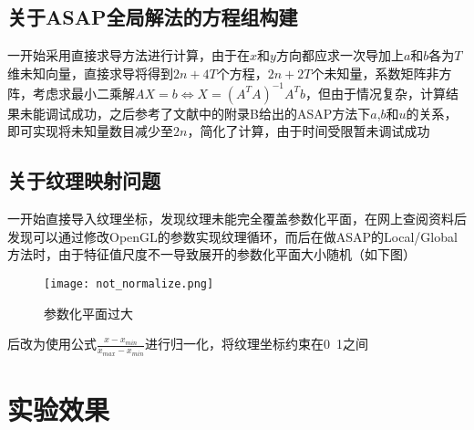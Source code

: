\documentclass[14pt]{scrartcl} %
\begin{document}
\subsection{关于ASAP全局解法的方程组构建}

一开始采用直接求导方法进行计算，由于在$x$和$y$方向都应求一次导加上$a$和$b$各为$T$维未知向量，直接求导将得到$2n+4T$个方程，$2n+2T$个未知量，系数矩阵非方阵，考虑求最小二乘解$AX=b\Leftrightarrow X=(A^TA)^{-1}A^Tb$，但由于情况复杂，计算结果未能调试成功，之后参考了文献\cite{liu2008local}中的附录B给出的ASAP方法下$a$,$b$和$u$的关系，即可实现将未知量数目减少至$2n$，简化了计算，由于时间受限暂未调试成功

\subsection{关于纹理映射问题}
一开始直接导入纹理坐标，发现纹理未能完全覆盖参数化平面，在网上查阅资料后发现可以通过修改OpenGL的参数实现纹理循环，而后在做ASAP的Local/Global方法时，由于特征值尺度不一导致展开的参数化平面大小随机（如下图）
\begin{figure}[h] %
	\centering
	\texttt{[image: not\_normalize.png]} %
	\caption{参数化平面过大}
\end{figure}

后改为使用公式$\frac{x-x_{min}}{x_{max}-x_{min}}$进行归一化，将纹理坐标约束在0~1之间

\pagebreak

\section{实验效果}
\end{document}
